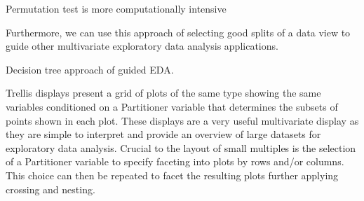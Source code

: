 Permutation test is more computationally
intensive


Furthermore, we can use this approach of selecting good splits of a data view to guide other multivariate exploratory data analysis applications.

Decision tree approach of guided EDA.

Trellis displays present a grid of plots of the same type showing the same variables conditioned on a Partitioner variable that determines the subsets of points shown in each plot. These displays are a very useful multivariate display as they are simple to interpret and provide an overview of large datasets for exploratory data analysis. Crucial to the layout of small multiples is the selection of a Partitioner variable to specify faceting into plots by rows and/or columns. This choice can then be repeated to facet the resulting plots further applying crossing and nesting.


